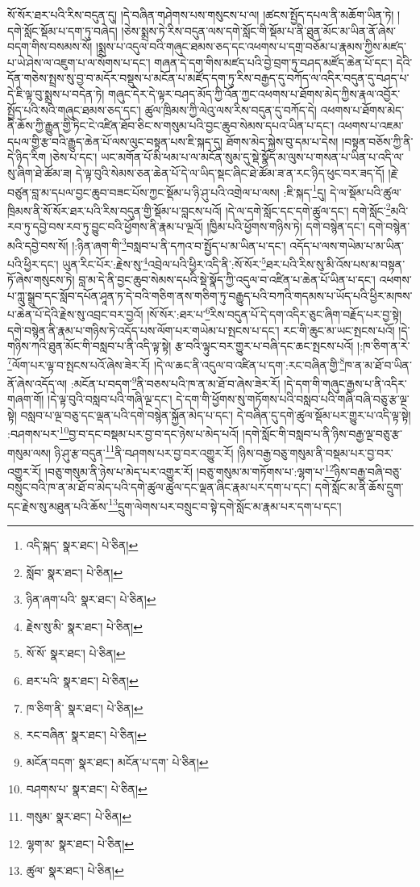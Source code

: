 སོ་སོར་ཐར་པའི་རིས་བདུན་དུ། །དེ་བཞིན་གཤེགས་པས་གསུངས་པ་ལ། །ཚངས་སྤྱོད་དཔལ་ནི་མཆོག་ཡིན་ཏེ། །དགེ་སློང་སྡོམ་པ་དག་ཏུ་བཞེད། །ཅེས་སྨྲས་ཏེ་རིས་བདུན་ལས་དགེ་སློང་གི་སྡོམ་པ་ནི་ཐུན་མོང་མ་ཡིན་ནོ་ཞེས་བདག་གིས་བསམས་སོ། །སྨྲས་པ་འདུལ་བའི་གཞུང་ཐམས་ཅད་དང་འཕགས་པ་དགྲ་བཅོམ་པ་རྣམས་ཀྱིས་མཛད་པ་ཡེ་ཤེས་ལ་འཇུག་པ་ལ་སོགས་པ་དང་། གཞན་དེ་དག་གིས་མཛད་པའི་བྱེ་བྲག་ཏུ་བཤད་མཛོད་ཆེན་པོ་དང་། དེའི་དོན་གཅེས་སྤྲས་སུ་བྱ་བ་མདོར་བསྡུས་པ་མངོན་པ་མཛོད་དག་ཏུ་རིས་བརྒྱད་དུ་བཀོད་ལ་འདིར་བདུན་དུ་བཤད་པ་དེ་ཇི་ལྟ་བུ་སྨྲས་པ་བདེན་ཏེ། གཞུང་དེར་དེ་ལྟར་བཤད་མོད་ཀྱི་འོན་ཀྱང་འཕགས་པ་ཐོགས་མེད་ཀྱིས་རྣལ་འབྱོར་སྤྱོད་པའི་སའི་གཞུང་ཐམས་ཅད་དང་། ཚུལ་ཁྲིམས་ཀྱི་ལེའུ་ལས་རིས་བདུན་དུ་བཀོད་དེ། འཕགས་པ་ཐོགས་མེད་ནི་ཆོས་ཀྱི་རྒྱུན་གྱི་ཏིང་ངེ་འཛིན་ཐོབ་ཅིང་ས་གསུམ་པའི་བྱང་ཆུབ་སེམས་དཔའ་ཡིན་པ་དང་། འཕགས་པ་འཇམ་དཔལ་གྱི་རྩ་བའི་རྒྱུད་ཆེན་པོ་ལས་ལུང་བསྟན་པས་ཇི་སྐད་དུ། ཐོགས་མེད་སྐྱེས་བུ་དམ་པ་དེས། །བསྟན་བཅོས་ཀྱི་ནི་དེ་ཉིད་རིག །ཅེས་པ་དང་། ཡང་མགོན་པོ་མི་ཕམ་པ་ལ་མངོན་སུམ་དུ་སྡེ་སྣོད་མ་ལུས་པ་གསན་པ་ཡིན་པ་འདི་ལ་སུ་ཞིག་ཐེ་ཚོམ་ཟ། དེ་ལྟ་བུའི་སེམས་ཅན་ཆེན་པོ་དེ་ལ་ཡིད་སྡང་ཞིང་ཐེ་ཚོམ་ཟ་ན་རང་ཉིད་ཕུང་བར་ཟད་དོ། །རྗེ་བཙུན་བླ་མ་དཔལ་བྱང་ཆུབ་བཟང་པོས་ཀྱང་སྡོམ་པ་ཉི་ཤུ་པའི་འགྲེལ་པ་ལས། :ཇི་སྐད་\footnote{འདི་སྐད་  སྣར་ཐང་།  པེ་ཅིན། }དུ། དེ་ལ་སྡོམ་པའི་ཚུལ་ཁྲིམས་ནི་སོ་སོར་ཐར་པའི་རིས་བདུན་གྱི་སྡོམ་པ་བླངས་པའོ། །དེ་ལ་དགེ་སློང་དང་དགེ་ཚུལ་དང་། དགེ་སློང་\footnote{སློབ་  སྣར་ཐང་།  པེ་ཅིན། }མའི་རབ་ཏུ་དབྱེ་བས་རབ་ཏུ་བྱུང་བའི་ཕྱོགས་ནི་རྣམ་པ་ལྔའོ། །ཁྱིམ་པའི་ཕྱོགས་གཉིས་ཏེ། དགེ་བསྙེན་དང་། དགེ་བསྙེན་མའི་དབྱེ་བས་སོ། །:ཉིན་ཞག་གི་\footnote{ཉིན་ཞག་པའི་  སྣར་ཐང་།  པེ་ཅིན། }བསླབ་པ་ནི་དཀའ་བ་སྤྱོད་པ་མ་ཡིན་པ་དང་། འདོད་པ་ལས་གཡེམ་པ་མ་ཡིན་པའི་ཕྱིར་དང་། ཡུན་རིང་པོར་:རྗེས་སུ་\footnote{རྗེས་སུ་མི་  སྣར་ཐང་།  པེ་ཅིན། }འབྲེལ་པའི་ཕྱིར་འདི་ནི་:སོ་སོར་\footnote{སོ་སོ་  སྣར་ཐང་།  པེ་ཅིན། }ཐར་པའི་རིས་སུ་མི་འོས་པས་མ་བསྟན་ཏོ་ཞེས་གསུངས་ཏེ། བླ་མ་དེ་ནི་བྱང་ཆུབ་སེམས་དཔའི་སྡེ་སྣོད་ཀྱི་འདུལ་བ་འཛིན་པ་ཆེན་པོ་ཡིན་པ་དང་། འཕགས་པ་ཀླུ་སྒྲུབ་དང་སློབ་དཔོན་ཤཱན་ཏ་དེ་བའི་གཅིག་ནས་གཅིག་ཏུ་བརྒྱུད་པའི་བཀའི་གདམས་པ་ཡོད་པའི་ཕྱིར་མཁས་པ་ཆེན་པོ་དེའི་རྗེས་སུ་འབྲང་བར་བྱའོ། །སོ་སོར་:ཐར་པ་\footnote{ཐར་པའི་  སྣར་ཐང་།  པེ་ཅིན། }རིས་བདུན་པོ་དེ་དག་འདིར་ཅུང་ཞིག་བརྗོད་པར་བྱ་སྟེ། དགེ་བསྙེན་ནི་རྣམ་པ་གཉིས་ཏེ་འདོད་པས་ལོག་པར་གཡེམ་པ་སྤངས་པ་དང་། རང་གི་ཆུང་མ་ཡང་སྤངས་པའོ། །དེ་གཉིས་ཀའི་ཐུན་མོང་གི་བསླབ་པ་ནི་འདི་ལྟ་སྟེ། རྩ་བའི་ལྟུང་བར་གྱུར་པ་བཞི་དང་ཆང་སྤངས་པའོ། །:ཁ་ཅིག་ན་རེ་\footnote{ཁ་ཅིག་ནི་  སྣར་ཐང་།  པེ་ཅིན། }ལོག་པར་ལྟ་བ་སྤངས་པའོ་ཞེས་ཟེར་རོ། །དེ་ལ་ཆང་ནི་འདུལ་བ་འཛིན་པ་དག་:རང་བཞིན་གྱི་\footnote{རང་བཞིན་  སྣར་ཐང་།  པེ་ཅིན། }ཁ་ན་མ་ཐོ་བ་ཡིན་ནོ་ཞེས་འདོད་ལ། :མངོན་པ་བདག་\footnote{མངོན་བདག་  སྣར་ཐང་། མངོན་པ་དག་  པེ་ཅིན། }ནི་བཅས་པའི་ཁ་ན་མ་ཐོ་བ་ཞེས་ཟེར་རོ། །དེ་དག་གི་གཞུང་རྒྱས་པ་ནི་འདིར་གཞག་གོ། །དེ་ལྟ་བུའི་བསླབ་པའི་གཞི་ལྔ་དང་། དེ་དག་གི་ཕྱོགས་སུ་གཏོགས་པའི་བསླབ་པའི་གཞི་བཞི་བཅུ་རྩ་ལྔ་སྟེ། བསླབ་པ་ལྔ་བཅུ་དང་ལྡན་པའི་དགེ་བསྙེན་སྐྱོན་མེད་པ་དང་། དེ་བཞིན་དུ་དགེ་ཚུལ་སྡོམ་པར་གྱུར་པ་འདི་ལྟ་སྟེ། :བཤགས་པར་\footnote{བཤགས་པ་  སྣར་ཐང་།  པེ་ཅིན། }བྱ་བ་དང་བསྡམ་པར་བྱ་བ་དང་ཉེས་པ་མེད་པའོ། །དགེ་སློང་གི་བསླབ་པ་ནི་ཉིས་བརྒྱ་ལྔ་བཅུ་རྩ་གསུམ་ལས། ཉི་ཤུ་རྩ་བདུན་\footnote{གསུམ་  སྣར་ཐང་།  པེ་ཅིན། }ནི་བཤགས་པར་བྱ་བར་འགྱུར་རོ། །ཉིས་བརྒྱ་བཅུ་གསུམ་ནི་བསྡམ་པར་བྱ་བར་འགྱུར་རོ། །བཅུ་གསུམ་ནི་ཉེས་པ་མེད་པར་འགྱུར་རོ། །བཅུ་གསུམ་མ་གཏོགས་པ་:ལྷག་པ་\footnote{ལྷག་མ་  སྣར་ཐང་།  པེ་ཅིན། }ཉིས་བརྒྱ་བཞི་བཅུ་བསྲུང་བའི་ཁ་ན་མ་ཐོ་བ་མེད་པའི་དགེ་ཚུལ་ཚུལ་དང་ལྡན་ཞིང་རྣམ་པར་དག་པ་དང་། དགེ་སློང་མ་ནི་ཆོས་དྲུག་དང་རྗེས་སུ་མཐུན་པའི་ཆོས་\footnote{ཚུལ་  སྣར་ཐང་།  པེ་ཅིན། }དྲུག་ལེགས་པར་བསྲུང་བ་སྟེ་དགེ་སློང་མ་རྣམ་པར་དག་པ་དང་། 